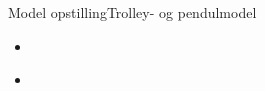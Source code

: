 \begin{frame}{Model opstilling}{Trolley- og pendulmodel}
  \begin{minipage}[t]{0.48\linewidth}
    \begin{itemize}
      	\item<1->[] {
              \begin{figure}[H]
              \centering
              
              \end{figure}}     
    \end{itemize}           
  \end{minipage}
  \begin{minipage}[t]{0.48\linewidth} 
    \begin{itemize}            
	\item<2->[] {
              \begin{figure}[H]
              \centering
              
              \end{figure}}	     	
    \end{itemize}           
  \end{minipage}
\end{frame} 

